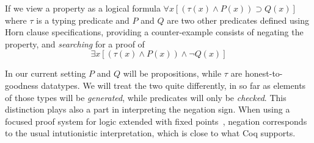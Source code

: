  If we view  a property as a logical formula
\(\forall x [(\tau(x)\wedge P(x)) \supset Q(x)]\) where $\tau$ is a
typing predicate and $P$ and $Q$ are two other predicates defined
using Horn clause specifications, providing a counter-example
consists of  negating the property, and \emph{searching} for a proof of
\[
  \exists x [(\tau(x)\wedge P(x)) \wedge \neg Q(x)]
  \tag{*}\label{eq:full}
\]

In our current setting $P$ and $Q$ will be  propositions, while $\tau$   are honest-to-goodness datatypes. We will treat the two quite differently, in so far as elements of those types will be \emph{generated}, while predicates will only be \emph{checked}. This distinction plays also a part in interpreting the negation sign.
%
When using a focused proof system for logic extended with fixed
points~\cite{baelde12tocl}, negation corresponds to the usual
intutionistic interpretation, which is close to what Coq supports.  %


